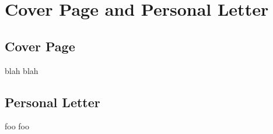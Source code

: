 \chapter{Cover Page and Personal Letter}

\section{Cover Page}
blah blah

\section{Personal Letter}
foo foo
